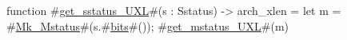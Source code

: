 function #\hyperref[sailRISCVzgetzysstatuszyUXL]{get\_sstatus\_UXL}#(s : Sstatus) -> arch_xlen = {
  let m = #\hyperref[sailRISCVzMkzyMstatus]{Mk\_Mstatus}#(s.#\hyperref[sailRISCVzbits]{bits}#());
  #\hyperref[sailRISCVzgetzymstatuszyUXL]{get\_mstatus\_UXL}#(m)
}
